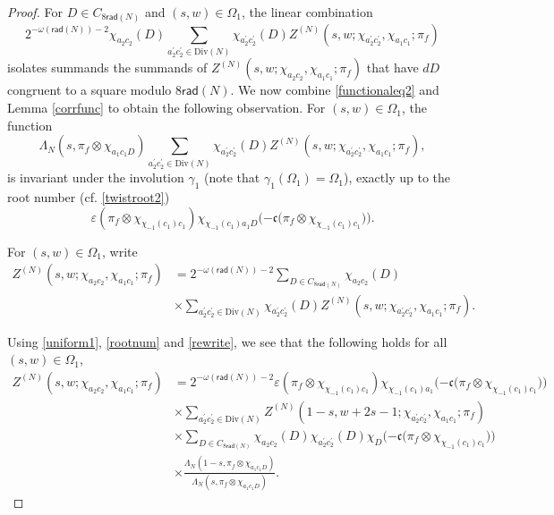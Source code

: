 \documentclass[12pt,reqno]{amsart}
\theoremstyle{plain}
\theoremstyle{remark}
\numberwithin{equation}{section}
\numberwithin{lemma}{section}
\numberwithin{theorem}{section}
\numberwithin{prop}{section}
\numberwithin{remark}{section}
\begin{document}
\begin{proof}
For $D \in C_{8 \mathsf{rad}(N)}$ and $(s,w) \in \Omega_1$, the linear combination 
\begin{equation*}
2^{-\omega( \mathsf{rad}(N))-2} \chi_{a_2 c_2}(D) 
 \sum_{a_2^{\prime} c_2^{\prime} \in \text{Div}(N)} 
\chi_{a_2^{\prime} c_2^{\prime}}(D) Z^{(N)}(s,w; \chi_{a_2^{\prime} c_2^{\prime}}, \chi_{a_1 c_1};\pi_f)
\end{equation*} 
isolates summands the summands of $Z^{(N)}(s,w; \chi_{a_2 c_2}, \chi_{a_1 c_1};\pi_f)$ that have 
$d D $ congruent to a square modulo $8 \mathsf{rad}(N)$. We now combine \eqref{functionaleq2}
and Lemma \ref{corrfunc} to obtain the following observation. For $(s,w) \in \Omega_1$,
the function 
\begin{equation} \label{uniform1}
\Lambda_N(s,\pi_f \otimes \chi_{a_1 c_1 D}) 
\sum_{a_2^{\prime} c_2^{\prime} \in \text{Div}(N)} 
\chi_{a_2^{\prime} c_2^{\prime}}(D)  Z^{(N)}(s,w; \chi_{a_2^{\prime} c_2^{\prime}}, \chi_{a_1 c_1};\pi_f), 
\end{equation}
is invariant under the involution $\gamma_1$ (note that $\gamma_1(\Omega_1)=\Omega_1$),
exactly up to the root number (cf. \eqref{twistroot2})
\begin{equation} \label{rootnum}
\varepsilon(\pi_f \otimes \chi_{\chi_{-1}(c_1)  c_1}) 
\chi_{\chi_{-1}(c_1) a_1 D} \big({-\mathfrak{c}(\pi_f \otimes \chi_{\chi_{-1}(c_1)c_1}} ) \big).
\end{equation}

 
For $(s,w) \in \Omega_1$, write
\begin{align} \label{rewrite}
Z^{(N)}(s,w; \chi_{a_2 c_2}, \chi_{a_1 c_1};\pi_f) 
&=2^{-\omega(\mathsf{rad}(N))-2} \sum_{D \in C_{8 \mathsf{rad}(N)}} \chi_{a_2 c_2}(D) \nonumber \\
& \times \sum_{a_2^{\prime} c_2^{\prime} \in \text{Div}(N) } \chi_{a_2^{\prime} c_2^{\prime}}(D) 
Z^{(N)}(s,w;\chi_{a_2^{\prime} c_2^{\prime}}, \chi_{a_1 c_1};\pi_f).
\end{align}

Using \eqref{uniform1}, \eqref{rootnum} and \eqref{rewrite}, 
we see that the following holds for all $(s,w) \in \Omega_1$,
\begin{align}  \label{intermedeq}
Z^{(N)}(s,w; \chi_{a_2 c_2},\chi_{a_1 c_1};\pi_f)
&=2^{-\omega(\mathsf{rad}(N))-2} \varepsilon(\pi_f \otimes \chi_{\chi_{-1}(c_1) c_1}) \chi_{\chi_{-1}(c_1) a_1} 
\big({-\mathfrak{c}(\pi_f \otimes \chi_{\chi_{-1}(c_1)c_1}})\big) \nonumber \\
& \times \sum_{a_2^{\prime} c_2^{\prime} \in \text{Div}(N)} 
Z^{(N)}(1-s,w+2s-1;\chi_{a_2^{\prime} c_2^{\prime}}, \chi_{a_1 c_1};\pi_f)  \nonumber \\
& \times \sum_{D \in C_{8 \mathsf{rad}(N)}} \chi_{a_2 c_2}(D) \chi_{a_2^{\prime} c_2^{\prime}}(D) 
 \chi_{D} \big({-\mathfrak{c}(\pi_f \otimes \chi_{\chi_{-1}(c_1)c_1}}) \big) \nonumber \\
& \times \frac{\Lambda_N(1-s,\pi_f \otimes \chi_{a_1 c_1 D})}{\Lambda_N(s,\pi_f \otimes \chi_{a_1 c_1 D})}.
\end{align}


\end{proof}
\end{document}
